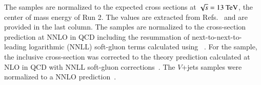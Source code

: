 The samples are normalized to the expected cross sections at $\sqrt{s}=13~\text{TeV}$,
the center of mass energy of Run 2. The values are extracted from Refs.~\cite{
Glasman:2765035, Campbell2021, Ball_2022, Kidonakis:2021vob, PhysRevD.81.054028}
and are provided in the last column.
The \ttbar samples are normalized to the cross-section prediction at
NNLO in QCD including the resummation of
next-to-next-to-leading logarithmic (NNLL) soft-gluon terms calculated using
\TOPpp[2.0]~\cite{Beneke:2011mq,Cacciari:2011hy,Baernreuther:2012ws,Czakon:2012zr,Czakon:2012pz,Czakon:2013goa,Czakon:2011xx}.
For the \tW sample, the inclusive cross-section was corrected to the theory prediction
calculated at NLO in QCD with NNLL soft-gluon
corrections~\cite{Kidonakis:2021vob}.
The \(V\)+jets samples were normalized to a NNLO prediction~\cite{Anastasiou:2003ds}.



